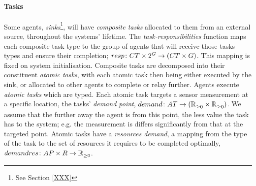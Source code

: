 \paragraph{Tasks}
\label{section:task_and_resources:tasks}

\newcommand{\formalTaskResponsibilities}[2]{
	\functionFormal{resp}
	{\setCompositeTask{}{} \times \powerSetAgent{}{}{}{}}
	({\setCompositeTask{}{} \times \setAgent{}{}})
}
\newcommand{\functionTaskResponsibilities}[2]{
	\functionSignature{resp}
	{\varCompositeTask{}{}, \setAgent{}{}}
}
\newcommand{\formalTaskDemandPoint}[2]{
	\functionFormal{demand}
	{\setAtomicTask  {}{}}{\tupleLocation{}{}}
}
\newcommand{\functionTaskDemandPoint}[2]{\functionSignature{demand}{\varAtomicTask{}{}}}
\newcommand{\functionRequiredResourcesSymbol}[2]{
	\functionSymbol{demandres}
}
\newcommand{\formalRequiredResources}[2]{
	\functionFormal{\functionRequiredResourcesSymbol{}{}}
	{\setAtomicTaskType{}{} \times \setResource{}{}}
	{\setRealNumbersNonNegative{}{}}
}
\newcommand{\functionRequiredResources}[2]{
	\functionSignature{\functionRequiredResourcesSymbol{}{}}{\varAtomicTaskType{}{}, \varResource{}{}}
}
\newcommand{\functionRequiredResourcesInstance}[2]{
	\functionSignature{\functionRequiredResourcesSymbol{}{}}
	{\functionAtomicTaskMapping{\varAtomicTask{}{}}{}, \varResource{}{}}
}

Some agents, \textit{sinks}\footnote{See Section \ref{XXX}}, will have \textit{composite tasks} allocated to them from an external source, throughout the systems' lifetime. The \textit{task-responsibilities} function maps each composite task type to the group of agents that will receive those tasks types and ensure their completion; $\formalTaskResponsibilities{}{}$. This mapping is fixed on system initialisation. Composite tasks are decomposed into their constituent \textit{atomic tasks}, with each atomic task then being either executed by the sink, or allocated to other agents to complete or relay further. Agents execute \textit{atomic tasks} which are typed. Each atomic task targets a sensor measurement at a specific location, the tasks' \textit{demand point}, $\formalTaskDemandPoint{}{}$. We assume that the further away the agent is from this point, the less value the task has to the system; e.g. the measurement is differs significantly from that at the targeted point. Atomic tasks have a \textit{resources demand}, a mapping from the type of the task to the set of resources it requires to be completed optimally, $\formalRequiredResources{}{}$. 

